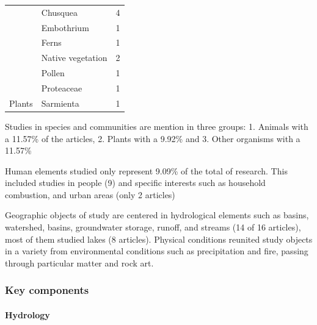 \documentclass[]{article}
\let\oldparagraph\paragraph
\renewcommand{\paragraph}[1]{\oldparagraph{#1}\mbox{}}
\begin{document}
\begin{table}
\begin{tabular}[t]{lll}
 & Chusquea & 4\\

 & Embothrium & 1\\

 & Ferns & 1\\

 & Native vegetation & 2\\

 & Pollen & 1\\

 & Proteaceae & 1\\

\multirow{-8}{*}{\raggedright\arraybackslash Plants} & Sarmienta & 1\\
\bottomrule
\end{tabular}
\end{table}

Studies in species and communities are mention in three groups: 1. Animals with a 11.57\% of the articles, 2. Plants with a 9.92\% and 3. Other organisms with a 11.57\%

Human elements studied only represent 9.09\% of the total of research. This included studies in people (9) and specific interests such as household combustion, and urban areas (only 2 articles)

Geographic objects of study are centered in hydrological elements such as basins, watershed, basins, groundwater storage, runoff, and streams (14 of 16 articles), most of them studied lakes (8 articles).
Physical conditions reunited study objects in a variety from environmental conditions such as precipitation and fire, passing through particular matter and rock art.

\hypertarget{key-components}{%
\subsubsection{Key components}\label{key-components}}

\hypertarget{hydrology}{%
\paragraph{Hydrology}\label{hydrology}}
\end{document}
